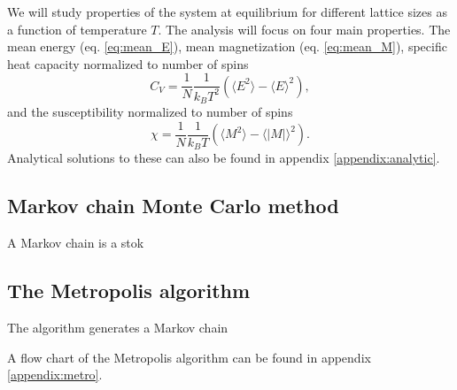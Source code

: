 \documentclass[english,notitlepage,reprint,nofootinbib]{revtex4-1}  %
\begin{document}
We will study properties of the system at equilibrium for different lattice sizes as a function of temperature $T$. The analysis will focus on four main properties. The mean energy (eq. \ref{eq:mean_E}), mean magnetization (eq. \ref{eq:mean_M}), specific heat capacity normalized to number of spins
\begin{equation}
    C_V = \frac{1}{N} \frac{1}{k_B T^2} \left( \langle E^2 \rangle - \langle E \rangle^2 \right),
\end{equation}
and the susceptibility normalized to number of spins
\begin{equation}
    \chi = \frac{1}{N} \frac{1}{k_B T} \left( \langle M^2 \rangle - \langle |M| \rangle^2 \right).
\end{equation}
Analytical solutions to these can also be found in appendix \ref{appendix:analytic}.


\subsection*{Markov chain Monte Carlo method}
A Markov chain is a stok

\subsection*{The Metropolis algorithm}
The algorithm generates a Markov chain

A flow chart of the Metropolis algorithm can be found in appendix \ref{appendix:metro}.
\end{document}
